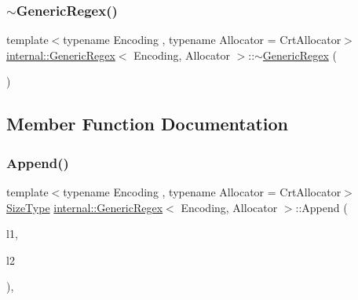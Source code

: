 \mbox{\label{classinternal_1_1GenericRegex_a6a4956c0391bccbf8580b2e047d5bc35}} 
\subsubsection{\texorpdfstring{$\sim$\+Generic\+Regex()}{~GenericRegex()}}
{\footnotesize\ttfamily template$<$typename Encoding , typename Allocator  = Crt\+Allocator$>$ \\
\hyperlink{classinternal_1_1GenericRegex}{internal\+::\+Generic\+Regex}$<$ Encoding, Allocator $>$\+::$\sim$\hyperlink{classinternal_1_1GenericRegex}{Generic\+Regex} (\begin{DoxyParamCaption}{ }\end{DoxyParamCaption})\hspace{0.3cm}{\ttfamily [inline]}}



\subsection{Member Function Documentation}
\mbox{\label{classinternal_1_1GenericRegex_a96b270e845e58787b624604531598517}} 
\subsubsection{\texorpdfstring{Append()}{Append()}}
{\footnotesize\ttfamily template$<$typename Encoding , typename Allocator  = Crt\+Allocator$>$ \\
\hyperlink{rapidjson_8h_a5ed6e6e67250fadbd041127e6386dcb5}{Size\+Type} \hyperlink{classinternal_1_1GenericRegex}{internal\+::\+Generic\+Regex}$<$ Encoding, Allocator $>$\+::Append (\begin{DoxyParamCaption}\item[{\hyperlink{rapidjson_8h_a5ed6e6e67250fadbd041127e6386dcb5}{Size\+Type}}]{l1,  }\item[{\hyperlink{rapidjson_8h_a5ed6e6e67250fadbd041127e6386dcb5}{Size\+Type}}]{l2 }\end{DoxyParamCaption})\hspace{0.3cm}{\ttfamily [inline]}, {\ttfamily [private]}}

